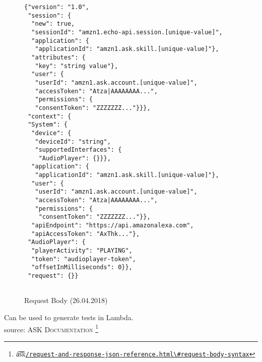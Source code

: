 \begin{figure}[H]
	\caption[HTTPS Request Body Syntax]{Request Body (26.04.2018) }
	\label{jsonFromAlexa}

\begin{verbatim}
{"version": "1.0",
 "session": {
  "new": true,
  "sessionId": "amzn1.echo-api.session.[unique-value]",
  "application": {
   "applicationId": "amzn1.ask.skill.[unique-value]"},
  "attributes": {
   "key": "string value"},
  "user": {
   "userId": "amzn1.ask.account.[unique-value]",
   "accessToken": "Atza|AAAAAAAA...",
   "permissions": {
   "consentToken": "ZZZZZZZ..."}}},
 "context": {
 "System": {
  "device": {
   "deviceId": "string",
   "supportedInterfaces": {
    "AudioPlayer": {}}},
  "application": {
   "applicationId": "amzn1.ask.skill.[unique-value]"},
  "user": {
   "userId": "amzn1.ask.account.[unique-value]",
   "accessToken": "Atza|AAAAAAAA...",
   "permissions": {
    "consentToken": "ZZZZZZZ..."}},
  "apiEndpoint": "https://api.amazonalexa.com",
  "apiAccessToken": "AxThk..."},
 "AudioPlayer": {
  "playerActivity": "PLAYING",
  "token": "audioplayer-token",
  "offsetInMilliseconds": 0}},
 "request": {}}
	
	\end{verbatim}
\end{figure}

Can be used to generate tests in Lambda.\\
source: \textsc{ASK Documentation} \footnote{\t{a\t{sk}}\href{https://developer.amazon.com/docs/custom-skills}{\lstinline|/request-and-response-json-reference.html\#request-body-syntax|}}




\newpage
{}
